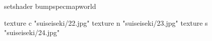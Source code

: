 setshader bumpspecmapworld

    texture c "suiseiseki/22.jpg"
    texture n "suiseiseki/23.jpg"
    texture s "suiseiseki/24.jpg"
